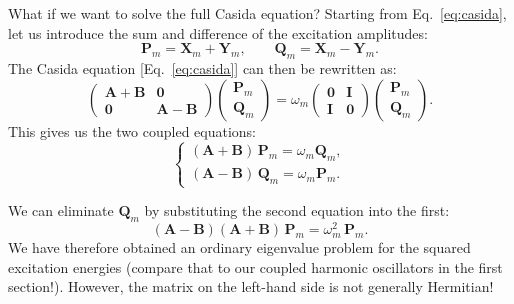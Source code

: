 \documentclass[10pt,aspectratio=169]{beamer}
\begin{document}
\begin{frame}
	What if we want to solve the full Casida equation?
	Starting from Eq.~\eqref{eq:casida}, let us introduce the sum and difference of the excitation amplitudes:
	\begin{equation*}
		\mathbf P_m=\mathbf X_m+\mathbf Y_m,\qquad
		\mathbf Q_m=\mathbf X_m-\mathbf Y_m.
	\end{equation*}
	\pause
	The Casida equation [Eq.~\eqref{eq:casida}] can then be rewritten as:
	\begin{equation*}
		\begin{pmatrix}
			\mathbf A+\mathbf B & \mathbf 0\\
			\mathbf 0 & \mathbf A-\mathbf B
		\end{pmatrix}
		\begin{pmatrix}
			\mathbf P_m\\
			\mathbf Q_m
		\end{pmatrix}
		=
		\omega_m
		\begin{pmatrix}
			\mathbf 0 & \mathbf I\\
			\mathbf I & \mathbf 0
		\end{pmatrix}
		\begin{pmatrix}
			\mathbf P_m\\
			\mathbf Q_m
		\end{pmatrix}.
	\end{equation*}
	\pause
	This gives us the two coupled equations:
	\begin{equation*}
		\begin{cases}
			(\mathbf A+\mathbf B)\,\mathbf P_m=\omega_m\mathbf Q_m,\\
			(\mathbf A-\mathbf B)\,\mathbf Q_m=\omega_m\mathbf P_m.
		\end{cases}
	\end{equation*}
	
	\pause
	\medskip
	We can eliminate $\mathbf Q_m$ by substituting the second equation into the first:
	\begin{equation*}
		(\mathbf A-\mathbf B)(\mathbf A+\mathbf B)\,\mathbf P_m=\omega_m^2\,\mathbf P_m.
	\end{equation*}
	We have therefore obtained an ordinary eigenvalue problem for the squared excitation energies (compare that to our coupled harmonic oscillators in the first section!). 
	However, the matrix on the left-hand side is not generally Hermitian!
\end{frame}
\end{document}
